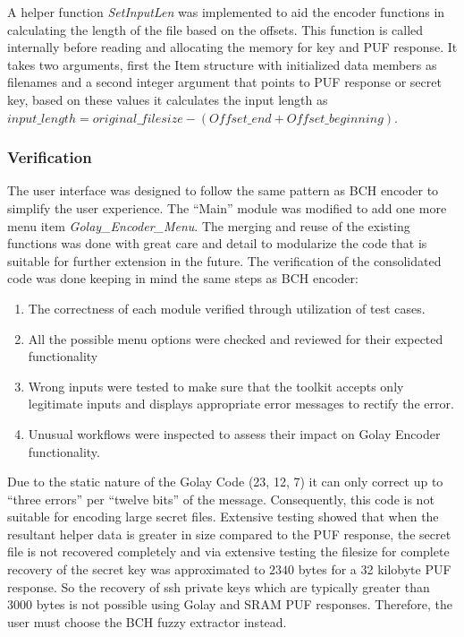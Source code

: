 	A helper function \emph{SetInputLen} was implemented to aid the encoder functions in calculating the length of the file based on the offsets. This function is called internally before reading and allocating the memory for key and PUF response. It takes two arguments, first the Item structure with initialized data members as filenames and a second integer argument that points to PUF response or secret key, based on these values it calculates the input length as $input\_length =
	original\_filesize - (Offset\_end + Offset\_beginning)$. \\

	\subsubsection{Verification}
	The user interface was designed to follow the same pattern as BCH encoder to simplify the user experience. The ``Main'' module was modified to add one more menu item \emph{Golay\_Encoder\_Menu}. The merging and reuse of the existing functions was done with great care and detail to modularize the code that is suitable for further extension in the future. The verification of the consolidated code was done keeping in mind the same steps as BCH encoder:
	\begin{enumerate}
		\item The correctness of each module verified through utilization of test cases.
		\item All the possible menu options were checked and reviewed for their expected functionality
		\item Wrong inputs were tested to make sure that the toolkit accepts only legitimate inputs and displays appropriate error messages to rectify the error.
		\item Unusual workflows were inspected to assess their impact on Golay Encoder functionality.
	\end{enumerate}

	Due to the static nature of the Golay Code (23, 12, 7) it can only correct up to ``three errors'' per ``twelve bits'' of the message. Consequently, this code is not suitable for encoding large secret files. Extensive testing showed that when the resultant helper data is greater in size compared to the PUF response, the secret file is not recovered completely and via extensive testing the filesize for complete recovery of the secret key was approximated to $2340$ bytes for a 32 kilobyte PUF response. So the recovery of ssh private keys which are
	typically greater than 3000 bytes is not possible using Golay and SRAM PUF responses. Therefore, the user must choose the BCH fuzzy extractor instead.

